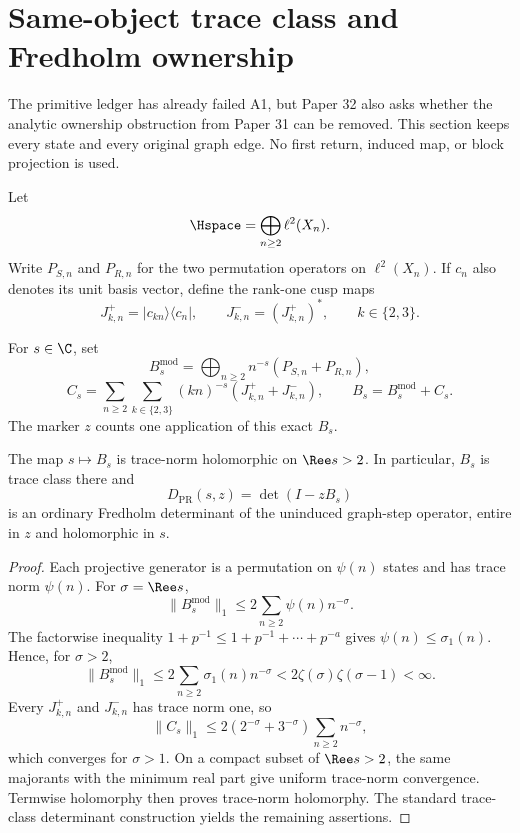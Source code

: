 \section{Same-object trace class and Fredholm ownership}
\label{sec:fredholm}

The primitive ledger has already failed A1, but Paper 32 also asks whether the
analytic ownership obstruction from Paper 31 can be removed.  This section
keeps every state and every original graph edge.  No first return, induced
map, or block projection is used.

Let
\[
 \Hspace=\bigoplus_{n\ge2}\ell^2(X_n).
\]
Write $P_{S,n}$ and $P_{R,n}$ for the two permutation operators on
$\ell^2(X_n)$.  If $c_n$ also denotes its unit basis vector, define the
rank-one cusp maps
\[
 J^+_{k,n}=|c_{kn}\rangle\langle c_n|,
 \qquad J^-_{k,n}=(J^+_{k,n})^*,
 \qquad k\in\{2,3\}.
\]

\begin{definition}
\label{def:primary-operator}
For $s\in\C$, set
\[
 B_s^{\mathrm{mod}}
 =\bigoplus_{n\ge2}n^{-s}(P_{S,n}+P_{R,n}),
\]
\[
 C_s=\sum_{n\ge2}\sum_{k\in\{2,3\}}(kn)^{-s}
 (J^+_{k,n}+J^-_{k,n}),\qquad B_s=B_s^{\mathrm{mod}}+C_s.
\]
The marker $z$ counts one application of this exact $B_s$.
\end{definition}

\begin{theorem}
\label{thm:trace-class}
The map $s\mapsto B_s$ is trace-norm holomorphic on $\Ree s>2$.  In
particular, $B_s$ is trace class there and
\[
 D_{\mathrm{PR}}(s,z)=\det(I-zB_s)
\]
is an ordinary Fredholm determinant of the uninduced graph-step operator,
entire in $z$ and holomorphic in $s$.
\end{theorem}

\begin{proof}
Each projective generator is a permutation on $\psi(n)$ states and has trace
norm $\psi(n)$.  For $\sigma=\Ree s$,
\[
 \|B_s^{\mathrm{mod}}\|_1
 \le2\sum_{n\ge2}\psi(n)n^{-\sigma}.
\]
The factorwise inequality
$1+p^{-1}\le1+p^{-1}+\cdots+p^{-a}$ gives
$\psi(n)\le\sigma_1(n)$.  Hence, for $\sigma>2$,
\[
 \|B_s^{\mathrm{mod}}\|_1
 \le2\sum_{n\ge2}\sigma_1(n)n^{-\sigma}
 <2\zeta(\sigma)\zeta(\sigma-1)<\infty.
\]
Every $J^+_{k,n}$ and $J^-_{k,n}$ has trace norm one, so
\[
 \|C_s\|_1
 \le2(2^{-\sigma}+3^{-\sigma})\sum_{n\ge2}n^{-\sigma},
\]
which converges for $\sigma>1$.  On a compact subset of $\Ree s>2$, the same
majorants with the minimum real part give uniform trace-norm convergence.
Termwise holomorphy then proves trace-norm holomorphy.  The standard
trace-class determinant construction \citep{simon1977infinite} yields the
remaining assertions.
\end{proof}

